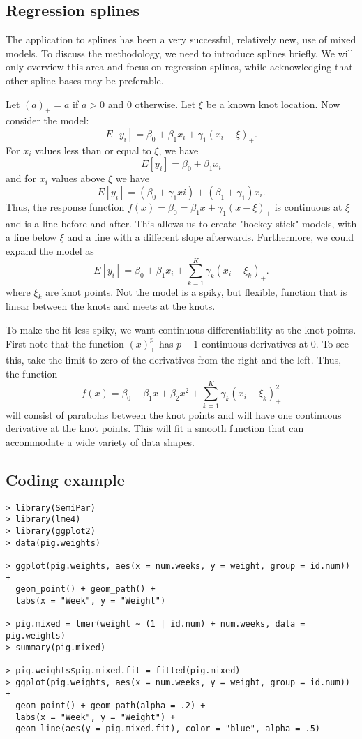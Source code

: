 
\subsection{Regression splines}
The application to splines has been a very successful, relatively new, use of 
mixed models. To discuss the methodology, we need to introduce splines briefly.
We will only overview this area and focus on regression splines, while acknowledging
that other spline bases may be preferable. 

Let $(a)_+ = a$ if $a > 0$ and $0$ otherwise. Let $\xi$ be a known
knot location. Now consider the model:
$$
E[y_i] = \beta_0 + \beta_1 x_i + \gamma_1 (x_i - \xi)_+.
$$
For $x_i$ values less than or equal to $\xi$, we have 
$$
E[y_i] = \beta_0 + \beta_1 x_i
$$
and for $x_i$ values above $\xi$ we have
$$
E[y_i] = (\beta_0 + \gamma_1 xi) + (\beta_1 + \gamma_1) x_i.
$$
Thus, the response function $f(x) = \beta_0 = \beta_1 x + \gamma_1 (x - \xi)_+$
is continuous at $\xi$ and is a line before and after. This allows us to create
"hockey stick" models, with a line below $\xi$ and a line with a different slope
afterwards. Furthermore, we could expand the model as 
$$
E[y_i] = \beta_0 + \beta_1 x_i + \sum_{k=1}^K \gamma_k (x_i - \xi_k)_+.
$$
where $\xi_k$ are knot points. Not the model is a spiky, but flexible, 
function that is linear between the knots and meets at the knots.

To make the fit less spiky, we want continuous differentiability at the knot
points. First note that the function $(x)_+^p$ has $p-1$ continuous derivatives at 0. 
To see this, take the limit to zero 
of the derivatives from the right and the left. Thus, the function
$$
f(x) = \beta_0 + \beta_1 x + \beta_2 x^2 + \sum_{k=1}^K \gamma_k (x_i - \xi_k)_+^2
$$
will consist of parabolas between the knot points and
will have one continuous derivative at the knot points. This will fit 
a smooth function that can accommodate a wide variety of data shapes. 


\subsection{Coding example}
\begin{verbatim}
> library(SemiPar)
> library(lme4)
> library(ggplot2)
> data(pig.weights)

> ggplot(pig.weights, aes(x = num.weeks, y = weight, group = id.num)) + 
  geom_point() + geom_path() +
  labs(x = "Week", y = "Weight")
  
> pig.mixed = lmer(weight ~ (1 | id.num) + num.weeks, data = pig.weights)
> summary(pig.mixed)

> pig.weights$pig.mixed.fit = fitted(pig.mixed)
> ggplot(pig.weights, aes(x = num.weeks, y = weight, group = id.num)) + 
  geom_point() + geom_path(alpha = .2) +
  labs(x = "Week", y = "Weight") +  
  geom_line(aes(y = pig.mixed.fit), color = "blue", alpha = .5)

\end{verbatim}


